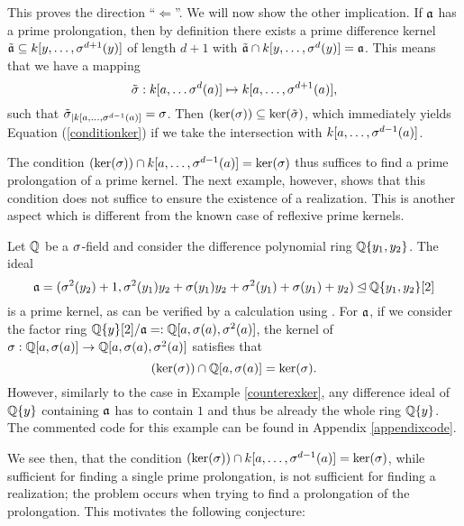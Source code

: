 \begin{prop}
\begin{bew}
This proves the direction ``$\Leftarrow$''. We will now show the other implication.
If $\mathfrak{a}$ has a prime prolongation, then by definition there exists a prime difference kernel $\tilde {\mathfrak{a}} \subseteq k[y,\ldots,\sigma^{d+1}(y)]$ of length $d+1$ with $\tilde {\mathfrak{a}} \cap k[y,\ldots,\sigma^d(y)] = \mathfrak{a}$.
This means that we have a mapping $$\tilde {\sigma} : k[a,\ldots\sigma^{d}(a)] \mapsto k[a,\ldots,\sigma^{d+1}(a)],$$
such that $\tilde {\sigma}_{|k[a,\ldots,\sigma^{d-1}(a)]} = \sigma$. Then $(\ker(\sigma)) \subseteq \ker(\tilde \sigma)$, which immediately yields Equation (\ref{conditionker}) if we take the intersection with $k[a,\ldots,\sigma^{d-1}(a)]$.
\end{bew}
\end{prop}

The condition $(\operatorname{ker}(\sigma)) \cap k[a,\ldots,\sigma^{d-1}(a)] = \operatorname{ker}(\sigma)$ thus suffices to find a prime prolongation of a prime kernel. 
The next example, however, shows that this condition does not suffice to ensure the existence of a realization. This is another aspect which is different from the known case of reflexive prime kernels.


\begin{ex}\label{secondexamplem2}
Let $\mathbb{Q}$ be a $\sigma$-field and consider the difference polynomial ring $\mathbb{Q}\{y_1,y_2\}$. 
The ideal $$\mathfrak{a} = (\sigma^2(y_2)+1,\sigma^2(y_1)y_2 + \sigma(y_1)y_2 + \sigma^2(y_1) + \sigma(y_1) + y_2) \unlhd \mathbb{Q}\{y_1,y_2\}[2]$$ is a prime kernel,
as can be verified by a calculation using \cite{M2}. For $\mathfrak{a}$, if we consider the factor ring 
$\mathbb{Q}\{y\}[2]/\mathfrak{a} =: \mathbb{Q}[a,\sigma(a),\sigma^2(a)]$, the kernel of \\ $\sigma: \mathbb{Q}[a,\sigma(a)] \rightarrow \mathbb{Q}[a,\sigma(a),\sigma^2(a)]$
satisfies that $$(\operatorname{ker}(\sigma)) \cap \mathbb{Q}[a,\sigma(a)] = \operatorname{ker}(\sigma).$$ However, similarly to the case in Example \ref{counterexker}, any difference ideal of $\mathbb{Q}\{y\}$ containing 
$\mathfrak{a}$ has to contain $1$ and thus be already the whole ring $\mathbb{Q}\{y\}$. The commented code for this example can be found in Appendix \ref{appendixcode}.
\end{ex}

We see then, that the condition $(\operatorname{ker}(\sigma)) \cap k[a,\ldots,\sigma^{d-1}(a)] = \operatorname{ker}(\sigma)$, while sufficient for finding a single prime prolongation,
is not sufficient for finding a realization; the problem occurs when trying to find a prolongation of the prolongation. This motivates the following conjecture:

